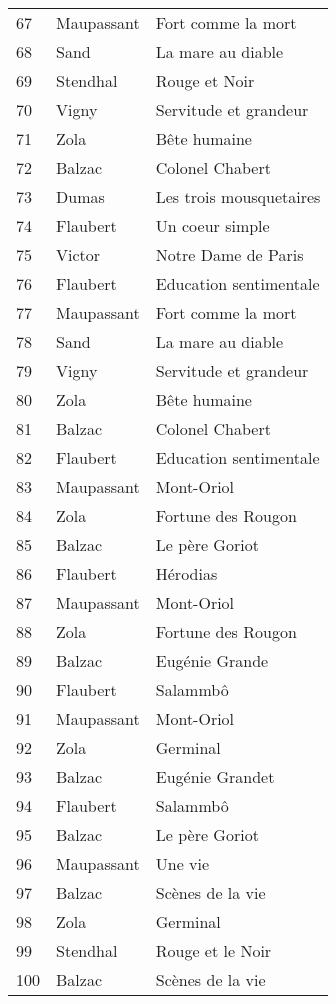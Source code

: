 \begin{table}
\begin{tabular}{|l|l|l|}
    67 & Maupassant & Fort comme la mort \\
    68 & Sand & La mare au diable \\
    69 & Stendhal & Rouge et Noir \\
    70 & Vigny & Servitude et grandeur \\
    71 & Zola & Bête humaine \\
    72 & Balzac & Colonel Chabert \\
    73 & Dumas & Les trois mousquetaires \\
    74 & Flaubert & Un coeur simple \\
    75 & Victor & Notre Dame de Paris \\
    76 & Flaubert & Education sentimentale \\
    77 & Maupassant & Fort comme la mort \\
    78 & Sand & La mare au diable \\
    79 & Vigny & Servitude et grandeur \\
    80 & Zola & Bête humaine \\
    81 & Balzac & Colonel Chabert \\
    82 & Flaubert & Education sentimentale \\
    83 & Maupassant & Mont-Oriol \\
    84 & Zola & Fortune des Rougon \\
    85 & Balzac & Le père Goriot \\
    86 & Flaubert & Hérodias \\
    87 & Maupassant & Mont-Oriol \\
    88 & Zola & Fortune des Rougon \\
    89 & Balzac & Eugénie Grande \\
    90 & Flaubert & Salammbô \\
    91 & Maupassant & Mont-Oriol \\
    92 & Zola & Germinal \\
    93 & Balzac & Eugénie Grandet \\
    94 & Flaubert & Salammbô \\
    95 & Balzac & Le père Goriot \\
    96 & Maupassant & Une vie \\
    97 & Balzac & Scènes de la vie \\
    98 & Zola & Germinal \\
    99 & Stendhal & Rouge et le Noir \\
    100 & Balzac & Scènes de la vie \\
    \hline
  \end{tabular}
\end{table}
